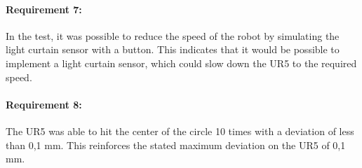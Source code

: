 \paragraph{Requirement 7:}
In the test, it was possible to reduce the speed of the robot by simulating the light curtain sensor with a button. This indicates that it would be possible to implement a light curtain sensor, which could slow down the UR5 to the required speed. 


\paragraph{Requirement 8:}
The UR5 was able to hit the center of the circle 10 times with a deviation of less than 0,1 mm. This reinforces the stated maximum deviation on the UR5 of 0,1 mm. 
 

 